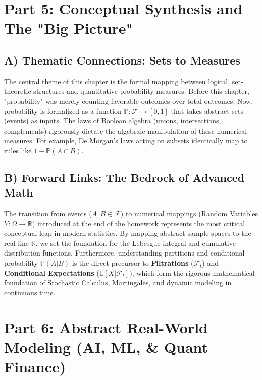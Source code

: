 \documentclass[12pt, a4paper]{article}
\theoremstyle{definition}
\theoremstyle{remark}
\newcommand{\R}{\mathbb{R}}
\newcommand{\E}{\mathbb{E}}
\newcommand{\Prob}{\mathbb{P}}
\newcommand{\F}{\mathcal{F}}
\newcommand{\W}{\Omega}
\newcommand{\1}{\mathbf{1}}
\begin{document}
\newpage

\section{Part 5: Conceptual Synthesis and The "Big Picture"}

\subsection{A) Thematic Connections: Sets to Measures}
The central theme of this chapter is the formal mapping between logical, set-theoretic structures and quantitative probability measures. Before this chapter, "probability" was merely counting favorable outcomes over total outcomes. Now, probability is formalized as a function $\Prob: \F \to [0,1]$ that takes abstract sets (events) as inputs. The laws of Boolean algebra (unions, intersections, complements) rigorously dictate the algebraic manipulation of these numerical measures. For example, De Morgan's laws acting on subsets identically map to rules like $1 - \Prob(A \cap B)$. 

\subsection{B) Forward Links: The Bedrock of Advanced Math}
The transition from events ($A, B \in \F$) to numerical mappings (Random Variables $Y: \W \to \R$) introduced at the end of the homework represents the most critical conceptual leap in modern statistics. By mapping abstract sample spaces to the real line $\R$, we set the foundation for the Lebesgue integral and cumulative distribution functions.
Furthermore, understanding partitions and conditional probability $\Prob(A|B)$ is the direct precursor to \textbf{Filtrations} ($\F_t$) and \textbf{Conditional Expectations} ($\E[X | \F_t]$), which form the rigorous mathematical foundation of Stochastic Calculus, Martingales, and dynamic modeling in continuous time.

\newpage

\section{Part 6: Abstract Real-World Modeling (AI, ML, \& Quant Finance)}
\end{document}
